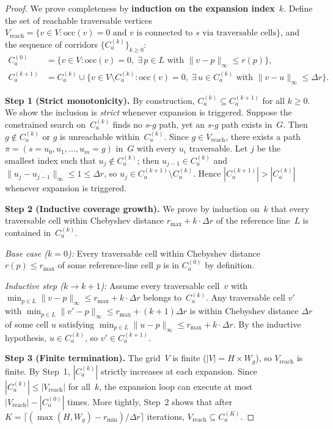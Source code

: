 \documentclass[11pt]{article}
\begin{document}
\begin{proof}
We prove completeness by \textbf{induction on the expansion index}~$k$.
Define the set of reachable traversable vertices $V_{\mathrm{reach}} = \{v \in V : \mathrm{occ}(v)=0 \text{ and } v \text{ is connected to } s \text{ via traversable cells}\}$, and the sequence of corridors $\{C_a^{(k)}\}_{k \geq 0}$:
\begin{align}
    C_a^{(0)} &= \{v \in V : \mathrm{occ}(v)=0,\; \exists\, p \in L \text{ with } \|v-p\|_{\infty} \leq r(p)\}, \\
    C_a^{(k+1)} &= C_a^{(k)} \cup \{v \in V \setminus C_a^{(k)} : \mathrm{occ}(v)=0,\; \exists\, u \in C_a^{(k)} \text{ with } \|v-u\|_{\infty} \leq \Delta r\}.
\end{align}

\textbf{Step 1 (Strict monotonicity).}
By construction, $C_a^{(k)} \subseteq C_a^{(k+1)}$ for all $k \geq 0$.
We show the inclusion is \emph{strict} whenever expansion is triggered.
Suppose the constrained search on~$C_a^{(k)}$ finds no $s$-$g$ path, yet an $s$-$g$ path exists in~$G$.
Then $g \notin C_a^{(k)}$ or $g$ is unreachable within~$C_a^{(k)}$.
Since $g \in V_{\mathrm{reach}}$, there exists a path $\pi = (s = u_0, u_1, \ldots, u_m = g)$ in~$G$ with every $u_i$ traversable.
Let $j$ be the smallest index such that $u_j \notin C_a^{(k)}$; then $u_{j-1} \in C_a^{(k)}$ and $\|u_j - u_{j-1}\|_{\infty} \leq 1 \leq \Delta r$, so $u_j \in C_a^{(k+1)} \setminus C_a^{(k)}$.
Hence $|C_a^{(k+1)}| > |C_a^{(k)}|$ whenever expansion is triggered.

\textbf{Step 2 (Inductive coverage growth).}
We prove by induction on~$k$ that every traversable cell within Chebyshev distance $r_{\max} + k \cdot \Delta r$ of the reference line~$L$ is contained in~$C_a^{(k)}$.

\emph{Base case ($k=0$):} Every traversable cell within Chebyshev distance $r(p) \leq r_{\max}$ of some reference-line cell $p$ is in $C_a^{(0)}$ by definition.

\emph{Inductive step ($k \to k{+}1$):}
Assume every traversable cell~$v$ with $\min_{p \in L}\|v-p\|_{\infty} \leq r_{\max} + k \cdot \Delta r$ belongs to~$C_a^{(k)}$.
Any traversable cell $v'$ with $\min_{p \in L}\|v'-p\|_{\infty} \leq r_{\max} + (k{+}1)\Delta r$ is within Chebyshev distance $\Delta r$ of some cell $u$ satisfying $\min_{p \in L}\|u-p\|_{\infty} \leq r_{\max} + k \cdot \Delta r$.
By the inductive hypothesis, $u \in C_a^{(k)}$, so $v' \in C_a^{(k+1)}$.

\textbf{Step 3 (Finite termination).}
The grid~$V$ is finite ($|V| = H \times W_g$), so $V_{\mathrm{reach}}$ is finite.
By Step~1, $|C_a^{(k)}|$ strictly increases at each expansion.
Since $|C_a^{(k)}| \leq |V_{\mathrm{reach}}|$ for all~$k$, the expansion loop can execute at most $|V_{\mathrm{reach}}| - |C_a^{(0)}|$ times.
More tightly, Step~2 shows that after $K = \lceil (\max(H, W_g) - r_{\min}) / \Delta r \rceil$ iterations, $V_{\mathrm{reach}} \subseteq C_a^{(K)}$.


\end{proof}
\end{document}
